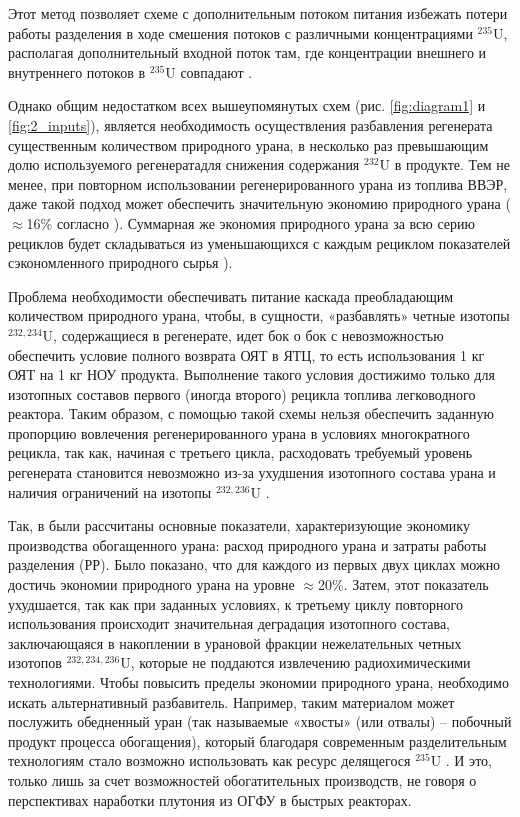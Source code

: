 Этот метод позволяет схеме с дополнительным потоком питания избежать потери работы разделения в ходе смешения потоков с различными концентрациями $^{235}$U, располагая дополнительный входной поток там, где концентрации внешнего и внутреннего потоков в $^{235}$U совпадают \cite{smirnovKaskadnyeShemyZadachah2012, sulaberidzeQuasiidealCascadesAdditional2006}.

Однако общим недостатком всех вышеупомянутых схем (рис. \ref{fig:diagram1} и \ref{fig:2_inputs}), является необходимость осуществления разбавления регенерата существенным количеством природного урана, в несколько раз превышающим долю используемого регенератадля снижения содержания $^{232}$U в продукте.
Тем не менее, при повторном использовании регенерированного урана из топлива ВВЭР, даже такой подход может обеспечить значительную экономию природного урана ($\approx$16\% согласно \cite{alekseevPossibleScenariosTransition2020}).
Суммарная же экономия природного урана за всю серию рециклов будет складываться из уменьшающихся с каждым рециклом показателей сэкономленного природного сырья \cite{colemanEvaluationMultipleSelfrecycling2010,smirnovEvolutionIsotopicComposition2012}).

Проблема необходимости обеспечивать питание каскада преобладающим количеством природного урана, чтобы, в сущности, «разбавлять» четные изотопы  $^{232,234}$U, содержащиеся в регенерате, идет бок о бок с невозможностью обеспечить условие полного возврата ОЯТ в ЯТЦ, то есть использования 1 кг ОЯТ на 1 кг НОУ продукта. Выполнение такого условия достижимо только для изотопных составов первого (иногда второго) рецикла топлива легководного реактора.
Таким образом, с помощью такой схемы нельзя обеспечить заданную пропорцию вовлечения регенерированного урана в условиях многократного рецикла, так как, начиная с третьего цикла, расходовать требуемый уровень регенерата становится невозможно из-за ухудшения изотопного состава урана и наличия ограничений на изотопы $^{232,236}$U \cite{smirnovApplyingEnrichmentCapacities2018}.

Так, в \cite{smirnovApplyingEnrichmentCapacities2018} были рассчитаны основные показатели, характеризующие экономику производства обогащенного урана: расход природного урана и затраты работы разделения (РР).
Было показано, что для каждого из первых двух циклах можно достичь экономии природного урана на уровне $\approx$20\%. Затем, этот показатель ухудшается, так как при заданных условиях, к третьему циклу повторного использования происходит значительная деградация изотопного состава, заключающаяся в накоплении в урановой фракции нежелательных четных изотопов $^{232,234,236}$U, которые не поддаются извлечению радиохимическими технологиями.
Чтобы повысить пределы экономии природного урана, необходимо искать альтернативный разбавитель. Например, таким материалом может послужить обедненный уран (так называемые «хвосты» (или отвалы) -- побочный продукт процесса обогащения), который благодаря современным разделительным технологиям стало возможно использовать как ресурс делящегося $^{235}$U \cite{oecdManagementDepletedUranium2001, ITOGIDEYaTELNOSTIGOSUDARSTVENNOY}.
И это, только лишь за счет возможностей обогатительных производств, не говоря о перспективах наработки плутония из ОГФУ в быстрых реакторах.

